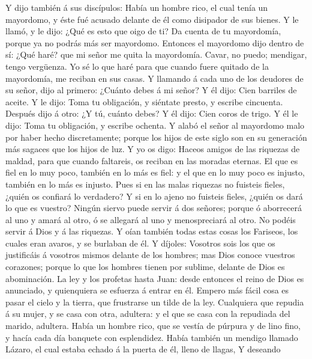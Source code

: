 Y dijo también á sus discípulos: Había un hombre rico, el
cual tenía un mayordomo, y éste fué acusado delante de él como disipador
de sus bienes.  Y le llamó, y le dijo: ¿Qué es esto que oigo
de ti? Da cuenta de tu mayordomía, porque ya no podrás más ser
mayordomo.  Entonces el mayordomo dijo dentro de sí: ¿Qué
haré? que mi señor me quita la mayordomía. Cavar, no puedo; mendigar,
tengo vergüenza.  Yo sé lo que haré para que cuando fuere
quitado de la mayordomía, me reciban en sus casas.  Y
llamando á cada uno de los deudores de su señor, dijo al primero:
¿Cuánto debes á mi señor?  Y él dijo: Cien barriles de
aceite. Y le dijo: Toma tu obligación, y siéntate presto, y escribe
cincuenta.  Después dijo á otro: ¿Y tú, cuánto debes? Y él
dijo: Cien coros de trigo. Y él le dijo: Toma tu obligación, y escribe
ochenta.  Y alabó el señor al mayordomo malo por haber hecho
discretamente; porque los hijos de este siglo son en su generación más
sagaces que los hijos de luz.  Y yo os digo: Haceos amigos
de las riquezas de maldad, para que cuando faltareis, os reciban en las
moradas eternas.  El que es fiel en lo muy poco, también en
lo más es fiel: y el que en lo muy poco es injusto, también en lo más es
injusto.  Pues si en las malas riquezas no fuisteis fieles,
¿quién os confiará lo verdadero?  Y si en lo ajeno no
fuisteis fieles, ¿quién os dará lo que es vuestro?  Ningún
siervo puede servir á dos señores; porque ó aborrecerá al uno y amará al
otro, ó se allegará al uno y menospreciará al otro. No podéis servir á
Dios y á las riquezas.  Y oían también todas estas cosas
los Fariseos, los cuales eran avaros, y se burlaban de él. 
Y díjoles: Vosotros sois los que os justificáis á vosotros mismos
delante de los hombres; mas Dios conoce vuestros corazones; porque lo
que los hombres tienen por sublime, delante de Dios es abominación.
 La ley y los profetas hasta Juan: desde entonces el reino
de Dios es anunciado, y quienquiera se esfuerza á entrar en él.
 Empero más fácil cosa es pasar el cielo y la tierra, que
frustrarse un tilde de la ley.  Cualquiera que repudia á su
mujer, y se casa con otra, adultera: y el que se casa con la repudiada
del marido, adultera.  Había un hombre rico, que se vestía
de púrpura y de lino fino, y hacía cada día banquete con esplendidez.
 Había también un mendigo llamado Lázaro, el cual estaba
echado á la puerta de él, lleno de llagas,  Y deseando
